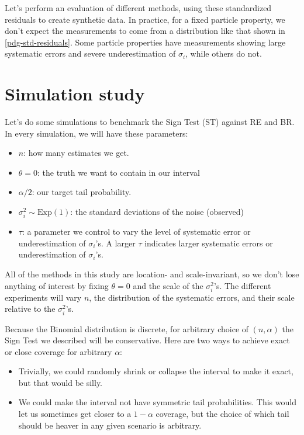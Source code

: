 \documentclass[12pt]{article}
\begin{document}
Let's perform an evaluation of different methods, using these standardized residuals to create synthetic data. In practice, for a fixed particle property, we don't expect the measurements to come from a distribution like that shown in \ref{pdg-std-residuals}. Some particle properties have measurements showing large systematic errors and severe underestimation of $\sigma_i$, while others do not.

\section{Simulation study}\label{simulation-study}

Let's do some simulations to benchmark the Sign Test (ST) against RE and BR. In every simulation, we will have these parameters:

\begin{itemize}
\item
  $n$: how many estimates we get.
\item
  $\theta=0$: the truth we want to contain in our interval
\item
  $\alpha/2$: our target tail probability.
\item
  $\sigma_i^2\sim\mathrm{Exp}(1)$: the standard deviations of the
  noise (observed)
\item
  $\tau$: a parameter we control to vary the level of systematic error
  or underestimation of $\sigma_i$'s. A larger $\tau$ indicates larger
  systematic errors or underestimation of $\sigma_i$'s.
\end{itemize}

All of the methods in this study are location- and scale-invariant, so we don't lose anything of interest by fixing $\theta=0$ and the scale of the $\sigma_i^2$'s. The different experiments will vary $n$, the distribution of the systematic errors, and their scale relative to the $\sigma_i^2$'s.

Because the Binomial distribution is discrete, for arbitrary choice of $(n,\alpha)$ the Sign Test we described will be conservative. Here are two ways to achieve exact or close coverage for arbitrary $\alpha$:

\begin{itemize}
\item
  Trivially, we could randomly shrink or collapse the interval to make it exact, but that would be silly.
\item
  We could make the interval not have symmetric tail probabilities. This would let us sometimes get closer to a $1-\alpha$ coverage, but the choice of which tail should be heaver in any given scenario is arbitrary.
\end{itemize}
\end{document}

